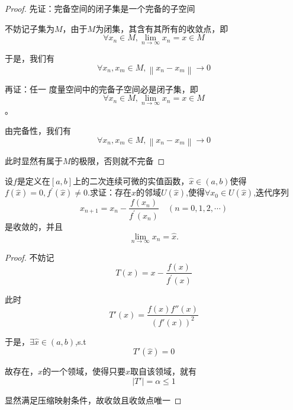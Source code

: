 \documentclass[lang=cn,10pt]{elegantbook}
\begin{document}
	\begin{proof}
		先证：完备空间的闭子集是一个完备的子空间
		
		不妨记子集为$M$，由于$M$为闭集，其含有其所有的收敛点，即
		\begin{equation*}
			\forall x_n\in M,\lim_{n\rightarrow \infty} x_n=x\in M
		\end{equation*}
		
		于是，我们有
		\begin{equation*}
			\forall x_n,x_m\in M,\left\| x_n-x_m \right\| \rightarrow 0
		\end{equation*}
		
		再证：任一
		度量空间中的完备子空间必是闭子集，即
		\begin{equation*}
			\forall x_n\in M,\lim_{n\rightarrow \infty} x_n=x\in M
		\end{equation*}。
		
		由完备性，我们有
		\begin{equation*}
			\forall x_n,x_m\in M,\left\| x_n-x_m \right\| \rightarrow 0
		\end{equation*}
		
		此时显然有属于$M$的极限，否则就不完备 
	\end{proof}
	\begin{exercise}
		设$f$是定义在$[a,b]$上的二次连续可微的实值函数，$\widehat{x}\in(a,b)$使得$f(\widehat{x})=0,f^\prime(\widehat{x})\neq0$.求证：存在$\widehat{x}$的邻域$U(\widehat{x})$,使得$\forall x_0\in U(\widehat{x})$,迭代序列
		\begin{equation*}
			x_{n+1}=x_n-\frac{f(x_n)}{f^{\prime}(x_n)}\quad(n=0,1,2,\cdots)
		\end{equation*}
		是收敛的，并且
		\begin{equation*}
			\lim_{n\to\infty}x_n=\widehat{x}.
		\end{equation*}
	\end{exercise}
	\begin{proof}
		不妨记
		\begin{equation*}
			T(x)=x-\frac{f(x)}{f^{\prime}(x)}
		\end{equation*}
		
		此时
		\begin{equation*}
			T'(x)=\frac{f(x)f''\left( x \right)}{\left( f'(x) \right) ^2}
		\end{equation*}
		
		于是，$\exists\widehat{x}\in(a,b)$,s.t
		\begin{equation*}
			T'(\widehat{x})=0
		\end{equation*}
		
		故存在，$\widehat{x}$的一个领域，使得只要$x$取自该领域，就有
		\begin{equation*}
			|T'|=\alpha\le1
		\end{equation*}
		
		显然满足压缩映射条件，故收敛且收敛点唯一
	\end{proof}
\end{document}
